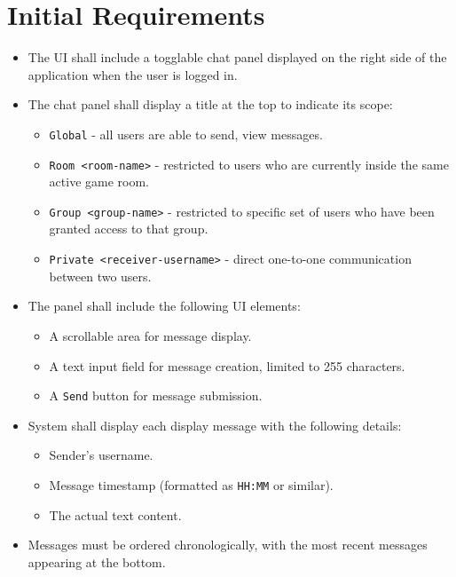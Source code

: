 \documentclass[]{VUMIFTemplateClass}
\begin{document}
\section{Initial Requirements}

\begin{itemize}

    \item The UI shall include a togglable chat panel displayed on the right side of the application when the user is logged in.
    \item The chat panel shall display a title at the top to indicate its scope:
    \begin{itemize}
        \item \texttt{Global} - all users are able to send, view messages.
        \item \texttt{Room <room-name>} - restricted to users who are currently inside the same active game room.
        \item \texttt{Group <group-name>} - restricted to specific set of users who have been granted access to that group.
        \item \texttt{Private <receiver-username>} - direct one-to-one communication between two users.
    \end{itemize}
    \item The panel shall include the following UI elements:
    \begin{itemize}
        \item A scrollable area for message display.
        \item A text input field for message creation, limited to 255 characters.
        \item A \texttt{Send} button for message submission.
    \end{itemize}

    \item System shall display each display message with the following details:
    \begin{itemize}
        \item Sender's username.
        \item Message timestamp (formatted as \texttt{HH:MM} or similar).
        \item The actual text content.
    \end{itemize}
    \item Messages must be ordered chronologically, with the most recent messages appearing at the bottom.


\end{itemize}
\end{document}
